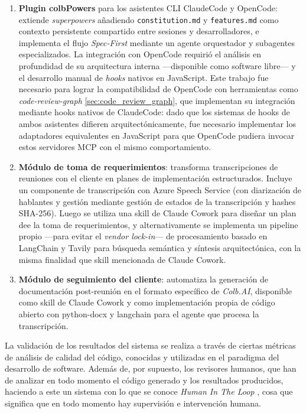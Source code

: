 \documentclass[11pt, letterpaper]{article}
\begin{document}
\begin{enumerate}
    \item \textbf{Plugin colbPowers} para los asistentes CLI ClaudeCode y OpenCode: extiende \textit{superpowers} añadiendo \texttt{constitution.md} y \texttt{features.md} como contexto persistente compartido entre sesiones y desarrolladores, e implementa el flujo \textit{Spec-First} mediante un agente orquestador y subagentes especializados. La integración con OpenCode requirió el análisis en profundidad de su arquitectura interna ---disponible como software libre--- y el desarrollo manual de \textit{hooks} nativos en JavaScript. Este trabajo fue necesario para lograr la compatibilidad de OpenCode con herramientas como \textit{code-review-graph} \ref{sec:code_review_graph}, que implementan su integración mediante hooks nativos de ClaudeCode: dado que los sistemas de hooks de ambos asistentes difieren arquitectónicamente, fue necesario implementar los adaptadores equivalentes en JavaScript para que OpenCode pudiera invocar estos servidores MCP con el mismo comportamiento.
    \item \textbf{Módulo de toma de requerimientos}: transforma transcripciones de reuniones con el cliente en planes de implementación estructurados. Incluye un componente de transcripción con Azure Speech Service (con diarización de hablantes y gestión mediante gestión de estados de la transcripción y hashes SHA-256). Luego se utiliza una skill de Claude Cowork para diseñar un plan dee la toma de requerimientos, y alternativamente se implementa un pipeline propio —para evitar el \textit{vendor lock-in}— de procesamiento basado en LangChain y Tavily para búsqueda semántica y síntesis arquitectónica, con la misma finalidad que skill mencionada de Claude Cowork.
    \item \textbf{Módulo de seguimiento del cliente}: automatiza la generación de documentación post-reunión en el formato específico de \textit{Colb.AI}, disponible como skill de Claude Cowork y como implementación propia de código abierto con python-docx y langchain para el agente que procesa la transcripción.
\end{enumerate}

La validación de los resultados del sistema se realiza a través de ciertas métricas de análisis de calidad del código, conocidas y utilizadas en el paradigma del desarrollo de software. Además de, por supuesto, los revisores humanos, que han de analizar en todo momento el código generado y los resultados producidos, haciendo a este un sistema con lo que se conoce \textit{Human In The Loop} \cite{vaithilingam_2022}, cosa que significa que en todo momento hay supervisión e intervención humana. \\
\end{document}
